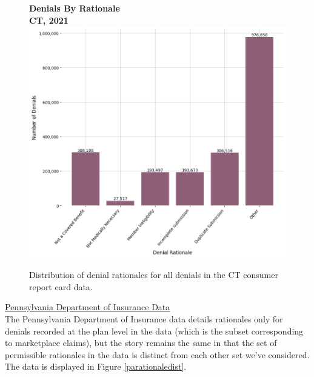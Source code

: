 \documentclass[12pt, a4paper,twoside,parskip=full]{report}
\theoremstyle{plain} %
\theoremstyle{definition} %
\theoremstyle{remark} %
\numberwithin{equation}{chapter}
\begin{document}
		\begin{figure}[h!]
			\centering
			\textbf{Denials By Rationale}\\
			\textbf{CT, 2021}\\
			\includegraphics[width=\columnwidth]{images/ct_claims/denials_by_rationale.png}
			\caption{Distribution of denial rationales for all denials in the CT consumer report card data. }
			\label{ctrationaledist}
		\end{figure}
	
		\clearpage
		
		\underline{Pennsylvania Department of Insurance Data}\\
		
		The Pennsylvania Department of Insurance data details rationales only for denials recorded at the plan level in the data (which is the subset corresponding to marketplace claims), but the story remains the same in that the set of permissible rationales in the data is distinct from each other set we've considered. The data is displayed in Figure \ref{parationaledist}.
		
\end{document}
